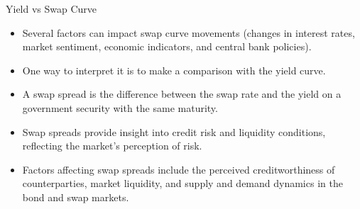 \documentclass{beamer}
\begin{document}
\begin{frame}{Yield vs Swap Curve} 
\begin{itemize}
\item Several factors can impact swap curve movements (changes in interest rates, market sentiment, economic indicators, and central bank policies).
\item One way to interpret it is to make a comparison with the yield curve.
\item A swap spread is the difference between the swap rate and the yield on a government security with the same maturity. 
\item Swap spreads provide insight into credit risk and liquidity conditions, reflecting the market's perception of risk. 
\item Factors affecting swap spreads include the perceived creditworthiness of counterparties, market liquidity, and supply and demand dynamics in the bond and swap markets. 
\end{itemize}
\end{frame}
\end{document}
